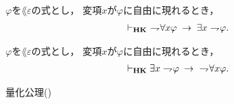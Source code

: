 	\begin{screen}
		\begin{thm}
			$\varphi$を$\lang{\varepsilon}$の式とし，
			変項$x$が$\varphi$に自由に現れるとき，
			\begin{align}
				\vdash_{{\scriptsize \mbox{{\bf HK}}}}\ \rightharpoondown\hspace{-0.25em} \forall x \varphi \hspace{0.25em}\rightarrow\hspace{0.25em} 
				\exists x \rightharpoondown\hspace{-0.25em} \varphi.
			\end{align}
		\end{thm}
	\end{screen}
	
	\begin{screen}
		\begin{thm}
			$\varphi$を$\lang{\varepsilon}$の式とし，
			変項$x$が$\varphi$に自由に現れるとき，
			\begin{align}
				\vdash_{{\scriptsize \mbox{{\bf HK}}}}
				\exists x \rightharpoondown\hspace{-0.25em} \varphi \hspace{0.25em}\rightarrow\hspace{0.25em}\ \rightharpoondown\hspace{-0.25em} \forall x \varphi.
			\end{align}
		\end{thm}
	\end{screen}
	
	\begin{sketch}
		量化公理()
	\end{sketch}